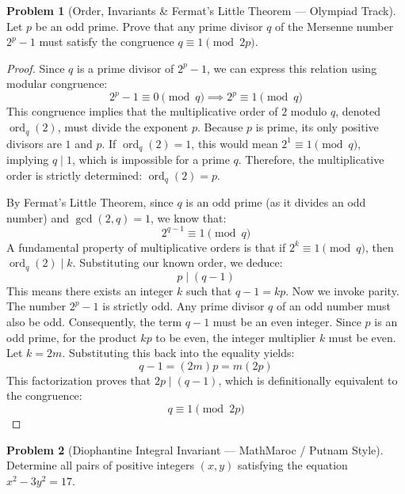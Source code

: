\documentclass[11pt, a4paper]{article}
\theoremstyle{definition}
\newtheorem{problem}{Problem}
\theoremstyle{plain}
\begin{document}
\vspace{0.5cm}

\begin{problem}[Order, Invariants \& Fermat's Little Theorem --- Olympiad Track]
Let $p$ be an odd prime. Prove that any prime divisor $q$ of the Mersenne number $2^p - 1$ must satisfy the congruence $q \equiv 1 \pmod{2p}$.
\end{problem}

\begin{proof}
Since $q$ is a prime divisor of $2^p - 1$, we can express this relation using modular congruence:
\[
2^p - 1 \equiv 0 \pmod{q} \implies 2^p \equiv 1 \pmod{q}
\]
This congruence implies that the multiplicative order of $2$ modulo $q$, denoted $\operatorname{ord}_q(2)$, must divide the exponent $p$.
Because $p$ is prime, its only positive divisors are $1$ and $p$.
If $\operatorname{ord}_q(2) = 1$, this would mean $2^1 \equiv 1 \pmod{q}$, implying $q \mid 1$, which is impossible for a prime $q$.
Therefore, the multiplicative order is strictly determined: $\operatorname{ord}_q(2) = p$.

By Fermat's Little Theorem, since $q$ is an odd prime (as it divides an odd number) and $\gcd(2, q) = 1$, we know that:
\[
2^{q - 1} \equiv 1 \pmod{q}
\]
A fundamental property of multiplicative orders is that if $2^k \equiv 1 \pmod{q}$, then $\operatorname{ord}_q(2) \mid k$. 
Substituting our known order, we deduce:
\[
p \mid (q - 1)
\]
This means there exists an integer $k$ such that $q - 1 = kp$.
Now we invoke parity. The number $2^p - 1$ is strictly odd. Any prime divisor $q$ of an odd number must also be odd. Consequently, the term $q - 1$ must be an even integer. 
Since $p$ is an odd prime, for the product $kp$ to be even, the integer multiplier $k$ must be even. Let $k = 2m$.
Substituting this back into the equality yields:
\[
q - 1 = (2m)p = m(2p)
\]
This factorization proves that $2p \mid (q - 1)$, which is definitionally equivalent to the congruence:
\[
q \equiv 1 \pmod{2p}
\]
\end{proof}

\vspace{0.5cm}

\begin{problem}[Diophantine Integral Invariant --- MathMaroc / Putnam Style]
Determine all pairs of positive integers $(x, y)$ satisfying the equation $x^2 - 3y^2 = 17$.
\end{problem}
\end{document}
